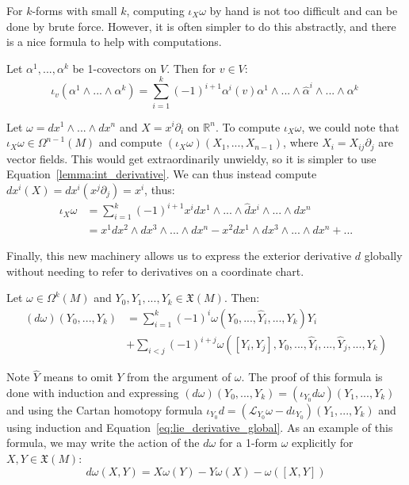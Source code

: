 For $k$-forms with small $k$, computing $\iota_X\omega$ by hand is not too difficult and can be done by brute force. 
However, it is often simpler to do this abstractly, and there is a nice formula to help with computations.
\begin{lemma}
	Let $\alpha^1, ..., \alpha^k$ be 1-covectors on $V$. Then for $v\in V$:
	\begin{equation}
		\iota_v(\alpha^1\wedge ...\wedge\alpha^k) = \sum_{i = 1}^k(-1)^{i + 1}\alpha^i(v)\alpha^1\wedge ...\wedge\hat
		\alpha^i\wedge ...\wedge\alpha^k~
		\label{lemma:int_derivative}
	\end{equation}
\end{lemma}

\begin{example}
	Let $\omega = dx^1\wedge ...\wedge dx^n$ and $X = x^i\partial_i$ on $\mathbb R^n$. To compute $\iota_X\omega$, 
	we could note that $\iota_X\omega\in\Omega^{n - 1}(M)$ and compute $(\iota_X\omega)(X_1, ..., X_{n - 1})$, 
	where $X_i = X_{ij}\partial_j$ are vector fields. This would get extraordinarily unwieldy, so it is simpler to use 
	Equation~\ref{lemma:int_derivative}. We can thus instead compute $dx^i(X) = dx^i(x^j\partial_j) = x^i$, thus:
	\begin{align}
		\iota_X\omega &= \sum_{i = 1}^k (-1)^{i + 1} x^i dx^1\wedge ...\wedge\hat dx^i\wedge ...\wedge dx^n \\
		&= x^1 dx^2\wedge dx^3\wedge ...\wedge dx^n - x^2 dx^1\wedge dx^3\wedge ...\wedge dx^n + ...
	\end{align}
\end{example}

Finally, this new machinery allows us to express the exterior derivative 
$d$ globally without needing to refer to derivatives on a coordinate chart.
\begin{theorem}
	Let $\omega\in\Omega^k(M)$ and $Y_0, Y_1, ..., Y_k\in\mathfrak X(M)$. Then:
	\begin{align}
		(d\omega)(Y_0, ..., Y_k) &= \sum_{i = 1}^k(-1)^i \omega(Y_0, ..., \hat Y_i, ..., Y_k)Y_i \\ 
		&+ \sum_{i < j}(-1)^{i + j}
		\omega([Y_i, Y_j], Y_0, ..., \hat Y_i, ..., \hat Y_j, ..., Y_k)
	\end{align}
\end{theorem}
Note $\hat Y$ means to omit $Y$ from the argument of $\omega$. The proof of this formula is done with induction and 
expressing $(d\omega)(Y_0, ..., Y_k) = (\iota_{Y_0} d\omega)(Y_1, ..., Y_k)$ and using the Cartan homotopy formula 
$\iota_{Y_0} d = (\mathcal L_{Y_0}\omega - d\iota_{Y_0})(Y_1, ..., Y_k)$ and using induction and 
Equation~\ref{eq:lie_derivative_global}. As an example of this formula, we may write the action of the $d\omega$ for a 
1-form $\omega$ explicitly for $X, Y\in\mathfrak X(M)$:
\begin{equation}
	d\omega(X, Y) = X\omega(Y) - Y\omega(X) - \omega([X, Y])
\end{equation}

